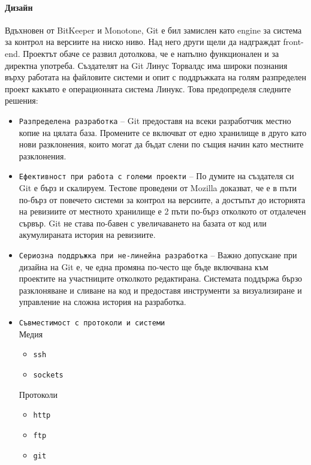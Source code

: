 \documentclass[a4paper]{article}
\begin{document}
    \paragraph{Дизайн}

    Вдъхновен от BitKeeper и Monotone, Git е бил замислен като engine за система за контрол на версиите на ниско ниво. Над него други щели да надграждат front-end. Проектът обаче се развил дотолкова, че е напълно функционален и за директна употреба. Създателят на Git Линус Торвалдс има широки познания върху работата на файловите системи и опит с поддръжката на голям разпределен проект какъвто е операционната система Линукс. Това предопределя следните решения:

    \begin{itemize}
      \item \texttt{Разпределена разработка} -- Git предоставя на всеки разработчик местно копие на цялата база. Промените се включват от едно хранилище в друго като нови разклонения, които могат да бъдат слени по същия начин като местните разклонения.
      \item \texttt{Ефективност при работа с големи проекти} -- По думите на създателя си Git е бърз и скалируем. Тестове проведени от Mozilla доказват, че е в пъти по-бърз от повечето системи за контрол на версиите, а достъпът до историята на ревизиите от местното хранилище е 2 пъти по-бърз отколкото от отдалечен сървър. Git не става по-бавен с увеличаването на базата от код или акумулираната история на ревизиите.
      \item \texttt{Сериозна поддръжка при не-линейна разработка} -- Важно допускане при дизайна на Git е, че една промяна по-често ще бъде включвана към проектите на участниците отколкото редактирана. Системата поддържа бързо разклоняване и сливане на код и предоставя инструменти за визуализиране и управление на сложна история на разработка.
      \item \texttt{Съвместимост с протоколи и системи} \\
        Медия
        \begin{itemize}
          \item \texttt{ssh}
          \item \texttt{sockets}
        \end{itemize}
        Протоколи
        \begin{itemize}
          \item \texttt{http}
          \item \texttt{ftp}
          \item \texttt{git}

\end{itemize}
\end{itemize}
\end{document}
